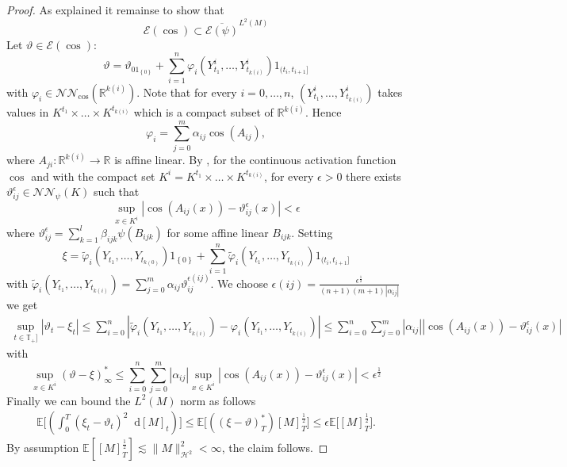 \documentclass[11pt,a4paper,twoside,openany]{report}
\newcommand{\diff}{\mathop{}\!\mathrm{d}}
\theoremstyle{plain} %
\theoremstyle{definition} %
\theoremstyle{remark} %
\let\parencite\authnumparencite
\begin{document}
\begin{proof}
As explained it remainse to show that 
    \begin{equation}
    \mathcal{E}(\cos)\subset \overline{\mathcal{E}(\psi)}^{L^2(M)}
\end{equation}
Let \(\vartheta\in\mathcal{E}(\cos)\):
\begin{equation}
    \vartheta = \vartheta_01_{\left\{0\right\}}+\sum_{i=1}^n \varphi_i(Y_{t_1}^i,\dots,Y_{t_{k(i)}}^i)1_{(t_i,t_{i+1}]}
\end{equation}
with \(\varphi_i\in\mathcal{NN}_{\cos}(\mathbb{R}^{k(i)})\). Note that for every \(i=0,\dots,n\), \((Y_{t_1}^i,\dots,Y_{t_{k(i)}}^i)\) takes values in \(K^{t_1}\times\dots\times K^{t_{k(i)}}\) which is a compact subset of \(\mathbb{R}^{k(i)}\). Hence 
\begin{equation}
    \varphi_i=\sum_{j=0}^m\alpha_{ij}\cos(A_{ij}),
\end{equation}
where \(A_{ji}:\mathbb{R}^{k(i)}\to\mathbb{R}\) is affine linear. 
By \parencite[Thm.~2]{Hornik1991}, for the continuous activation function \(\cos\) and with the compact set \(K^i=K^{t_1}\times\dots\times K^{t_{k(i)}}\), for every \(\epsilon>0\) there exists \(\vartheta_{ij}^{\epsilon}\in\mathcal{NN}_{\psi}(K)\) such that 
\begin{equation}
    \sup_{x\in K^i}|\cos(A_{ij}(x))-\vartheta_{ij}^{\epsilon}(x)|<\epsilon
\end{equation}
where \(\vartheta_{ij}^{\epsilon}=\sum_{k=1}^l\beta_{ijk}\psi(B_{ijk})\) for some affine linear \(B_{ijk}\). Setting
\begin{equation}
    \xi = \widetilde{\varphi}_i(Y_{t_1},\dots,Y_{t_{k(0)}})1_{\left\{ 0\right\}}+\sum_{i=1}^n\widetilde{\varphi}_i(Y_{t_1},\dots,Y_{t_{k(i)}})1_{(t_i,t_{i+1}]}
\end{equation}
with \(\widetilde{\varphi}_i(Y_{t_1},\dots,Y_{t_{k(i)}})=\sum_{j=0}^m\alpha_{ij}\vartheta_{ij}^{\epsilon(ij)}\). We choose \(\epsilon(ij)=\frac{\epsilon^{\frac{1}{2}}}{(n+1)(m+1)|\alpha_{ij}|}\)
we get 
\begin{align*}
    \sup_{t\in\mathbb{T}_+]}|\vartheta_t-\xi_t|\leq \sum_{i=0}^{n}|\widetilde{\varphi}_i(Y_{t_1},\dots,Y_{t_{k(i)}})-\varphi_i(Y_{t_1},\dots,Y_{t_{k(i)}})|\leq \sum_{i=0}^{n}\sum_{j=0}^m|\alpha_{ij}||\cos(A_{ij}(x))-\vartheta_{ij}^{\epsilon}(x)|
\end{align*}
with
\begin{equation}
    \sup_{x\in K^i}(\vartheta-\xi)_{\infty}^*\leq \sum_{i=0}^{n}\sum_{j=0}^m|\alpha_{ij}|\sup_{x\in K^i}|\cos(A_{ij}(x))-\vartheta_{ij}^{\epsilon}(x)|< \epsilon^{\frac{1}{2}}
\end{equation}
Finally we can bound the \(L^2(M)\) norm as follows
\begin{align*}
    \mathbb{E}\bigg[\left(\int_{0}^{T}(\xi_t-\vartheta_t)^2\diff [M]_t\right)\bigg]\leq \mathbb{E}\Big[((\xi-\vartheta)_{T}^*)[M]_{T}^{\frac{1}{2}}\Big]\leq\epsilon\mathbb{E}\Big[[M]_{T}^{\frac{1}{2}}\Big].
\end{align*}
By assumption \(\mathbb{E}[[M]_{T}^{\frac{1}{2}}]\lesssim\lVert M\rVert_{\mathcal{H}^2}^2<\infty\), the claim follows. 
\end{proof}
\end{document}
